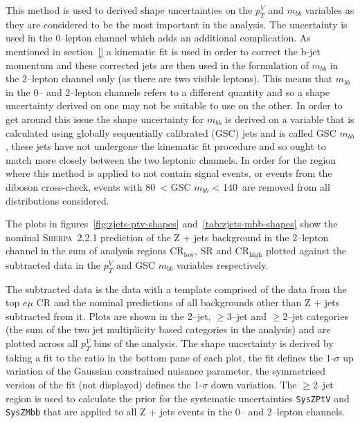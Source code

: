 This method is used to derived shape uncertainties on the $p_T^V$ and $m_{bb}$
variables as they are considered to be the most important in the analysis. The
uncertainty is used in the 0--lepton channel which adds an additional
complication. As mentioned in section~\ref{} a kinematic fit is used in order to
correct the b-jet momentum and these corrected jets are then used in the
formulation of $m_{bb}$ in the 2--lepton channel only (as there are two visible
leptons). This means that $m_{bb}$ in the 0-- and 2--lepton channels refers to a
different quantity and so a shape uncertainty derived on one may not be suitable
to use on the other. In order to get around this issue the shape uncertainty for
$m_{bb}$ is derived on a variable that is calculated using globally sequentially
calibrated (GSC) jets and is called GSC $m_{bb}$, these jets have not undergone
the kinematic fit procedure and so ought to match more closely between the two
leptonic channels. In order for the region where this method is applied to not
contain signal events, or events from the diboson cross-check, events with
80~\GeV < GSC $m_{bb}$ < 140~\GeV are removed from all distributions considered.

The plots in figures~\ref{fig:zjets-ptv-shapes} and~\ref{tab:zjets-mbb-shapes}
show the nominal \textsc{Sherpa}~2.2.1 prediction of the Z + jets background in
the 2--lepton channel in the sum of analysis regions CR$_{\text{low}}$, SR and
CR$_{\text{high}}$ plotted against the subtracted data in the $p_T^V$ and GSC
$m_{bb}$ variables respectively.


The subtracted data is the data with a template comprised of the data from the
top $e\mu$ CR and the nominal predictions of all backgrounds other than Z + jets
subtracted from it. Plots are shown in the 2--jet, $\geq$3--jet and $\geq$2--jet
categories (the sum of the two jet multiplicity based categories in the
analysis) and are plotted across all $p_T^V$ bins of the analysis. The shape
uncertainty is derived by taking a fit to the ratio in the bottom pane of each
plot, the fit defines the 1-$\sigma$ up variation of the Gaussian constrained
nuisance parameter, the symmetrised version of the fit (not displayed) defines
the 1-$\sigma$ down variation. The $\geq$2--jet region is used to calculate the
prior for the systematic uncertainties \texttt{SysZPtV} and \texttt{SysZMbb}
that are applied to all Z + jets events in the 0-- and 2--lepton channels.

